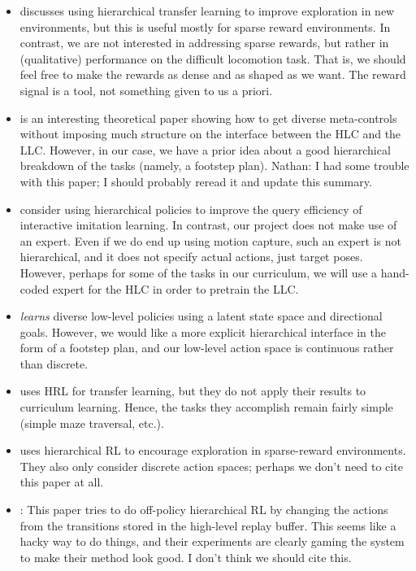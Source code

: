 \documentclass[a4paper]{article}
\newcommand{\nhatch}[1]{{\leavevmode\color{blue} Nathan: #1}}
\begin{document}
\begin{itemize}
  \item \cite{heess2016learning} discusses using hierarchical transfer learning to improve exploration in new environments, but this is useful mostly for sparse reward environments.
    In contrast, we are not interested in addressing sparse rewards, but rather in (qualitative) performance on the difficult locomotion task.
    That is, we should feel free to make the rewards as dense and as shaped as we want.
    The reward signal is a tool, not something given to us a priori.

  \item \cite{hausman2018learning} is an interesting theoretical paper showing how to get diverse meta-controls without imposing much structure on the interface between the HLC and the LLC.
    However, in our case, we have a prior idea about a good hierarchical breakdown of the tasks (namely, a footstep plan).
    \nhatch{I had some trouble with this paper; I should probably reread it and update this summary.}

  \item \cite{daume18ilrl} consider using hierarchical policies to improve the query efficiency of interactive imitation learning.
    In contrast, our project does not make use of an expert.
    Even if we do end up using motion capture, such an expert is not hierarchical, and it does not specify actual actions, just target poses.
    However, perhaps for some of the tasks in our curriculum, we will use a hand-coded expert for the HLC in order to pretrain the LLC.

  \item \cite{vezhnevets2017feudal} \emph{learns} diverse low-level policies using a latent state space and directional goals.
    However, we would like a more explicit hierarchical interface in the form of a footstep plan, and our low-level action space is continuous rather than discrete.

  \item \cite{frans2018meta} uses HRL for transfer learning, but they do not apply their results to curriculum learning.
    Hence, the tasks they accomplish remain fairly simple (simple maze traversal, etc.).

  \item \cite{kulkarni2016hierarchical} uses hierarchical RL to encourage exploration in sparse-reward environments.
    They also only consider discrete action spaces; perhaps we don't need to cite this paper at all.
  \item \cite{nachum2018data}: This paper tries to do off-policy hierarchical RL by changing the actions from the transitions stored in the high-level replay buffer.
    This seems like a hacky way to do things, and their experiments are clearly gaming the system to make their method look good.
    I don't think we should cite this.
\end{itemize}
\end{document}

